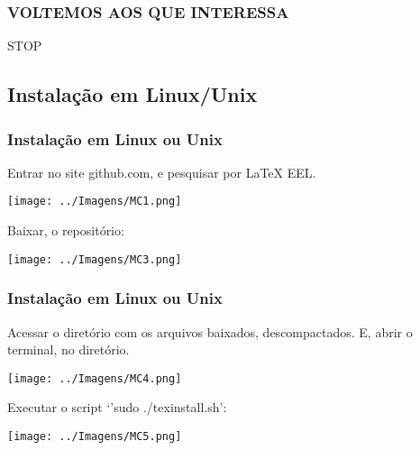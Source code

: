 \documentclass[9pt]{beamer}
\begin{document}
\begin{frame}
  \begin{center}
    \frametitle{VOLTEMOS AOS QUE INTERESSA}
    \begin{tcolorbox}[
      size=minimal,
      width=4.2cm,octogon arc,
      colback=red,colframe=white,colupper=white,
      fontupper=\fontsize{14mm}{14mm}\selectfont\bfseries\sffamily,
      auto outer arc,
      halign=center,valign=center,
      square, arc is angular,
      borderline={0.4mm}{-2mm}{red}]
      STOP
    \end{tcolorbox}

  \end{center}
\end{frame}

\begin{frame}
  \section{Instalação em Linux/Unix}
  \frametitle{Instalação em Linux ou Unix}

  \begin{tcolorbox}[width=10cm, height=6.7mm, top=0.2mm, sharp corners]
    Entrar no site github.com, e pesquisar por LaTeX EEL.
  \end{tcolorbox}

  \texttt{[image: ../Imagens/MC1.png]}

  \pause

  \begin{tcolorbox}[width=4.5cm, height=6.7mm, top=0.2mm, sharp corners=downhill ]
    Baixar, o repositório:
  \end{tcolorbox}
  \texttt{[image: ../Imagens/MC3.png]}

\end{frame}

\begin{frame}
  \frametitle{Instalação em Linux ou Unix}

  \begin{tcolorbox}[width=12cm, height=10.1mm, top=0.1mm]
    Acessar o diretório com os arquivos baixados, descompactados. E,
    abrir o terminal, no diretório.
  \end{tcolorbox}

  \begin{center}
    \texttt{[image: ../Imagens/MC4.png]}
  \end{center}

  \pause

  \begin{tcolorbox}[sharp corners, width=12cm, height=6.7mm, top=0.2mm]
    Executar o script `'sudo ./texinstall.sh':
  \end{tcolorbox}

  \begin{center}
    \texttt{[image: ../Imagens/MC5.png]}
  \end{center}

\end{frame}
\end{document}
